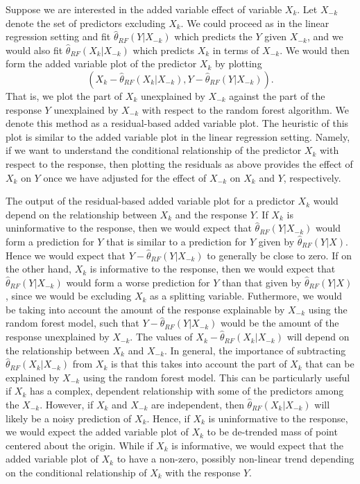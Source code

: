 \documentclass[12pt,twoside]{reedthesis}
\theoremstyle{definition}
\theoremstyle{definition}
\theoremstyle{definition}
\theoremstyle{remark}
\begin{document}
Suppose we are interested in the added variable effect of variable
\(X_k\). Let \(X_{-k}\) denote the set of predictors excluding \(X_k\).
We could proceed as in the linear regression setting and fit
\(\hat{\theta}_{RF}(Y|X_{-k})\) which predicts the \(Y\) given
\(X_{-k}\), and we would also fit \(\hat{\theta}_{RF}(X_k|X_{-k})\)
which predicts \(X_k\) in terms of \(X_{-k}\). We would then form the
added variable plot of the predictor \(X_k\) by plotting
\[(X_k-\hat{\theta}_{RF}(X_k|X_{-k}),Y-\hat{\theta}_{RF}(Y|X_{-k})).\]
That is, we plot the part of \(X_k\) unexplained by \(X_{-k}\) against
the part of the response \(Y\) unexplained by \(X_{-k}\) with respect to
the random forest algorithm. We denote this method as a residual-based
added variable plot. The heuristic of this plot is similar to the added
variable plot in the linear regression setting. Namely, if we want to
understand the conditional relationship of the predictor \(X_k\) with
respect to the response, then plotting the residuals as above provides
the effect of \(X_k\) on \(Y\) once we have adjusted for the effect of
\(X_{-k}\) on \(X_k\) and \(Y\), respectively. \par

The output of the residual-based added variable plot for a predictor
\(X_k\) would depend on the relationship between \(X_k\) and the
response \(Y\). If \(X_k\) is uninformative to the response, then we
would expect that \(\hat{\theta}_{RF}(Y|X_{-k})\) would form a
prediction for \(Y\) that is similar to a prediction for \(Y\) given by
\(\hat{\theta}_{RF}(Y|X)\). Hence we would expect that
\(Y-\hat{\theta}_{RF}(Y|X_{-k})\) to generally be close to zero. If on
the other hand, \(X_k\) is informative to the response, then we would
expect that \(\hat{\theta}_{RF}(Y|X_{-k})\) would form a worse
prediction for \(Y\) than that given by \(\hat{\theta}_{RF}(Y|X)\),
since we would be excluding \(X_k\) as a splitting variable. Futhermore,
we would be taking into account the amount of the response explainable
by \(X_{-k}\) using the random forest model, such that
\(Y-\hat{\theta}_{RF}(Y|X_{-k})\) would be the amount of the response
unexplained by \(X_{-k}\). The values of
\(X_k-\hat{\theta}_{RF}(X_k|X_{-k})\) will depend on the relationship
between \(X_k\) and \(X_{-k}\). In general, the importance of
subtracting \(\hat{\theta}_{RF}(X_k|X_{-k})\) from \(X_k\) is that this
takes into account the part of \(X_k\) that can be explained by
\(X_{-k}\) using the random forest model. This can be particularly
useful if \(X_k\) has a complex, dependent relationship with some of the
predictors among the \(X_{-k}\). However, if \(X_k\) and \(X_{-k}\) are
independent, then \(\hat{\theta}_{RF}(X_k|X_{-k})\) will likely be a
noisy prediction of \(X_k\). Hence, if \(X_k\) is uninformative to the
response, we would expect the added variable plot of \(X_k\) to be
de-trended mass of point centered about the origin. While if \(X_k\) is
informative, we would expect that the added variable plot of \(X_k\) to
have a non-zero, possibly non-linear trend depending on the conditional
relationship of \(X_k\) with the response \(Y\).
\end{document}
